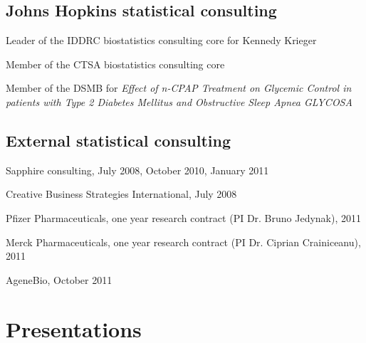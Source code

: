 \documentclass[12pt]{article}
\begin{document}
\subsection*{Johns Hopkins statistical consulting}
\begin{description}
\item Leader of the IDDRC biostatistics consulting core for Kennedy Krieger 
\item Member of the CTSA biostatistics consulting core  
\item Member of the DSMB for {\it Effect of n-CPAP Treatment on Glycemic Control  in patients with  Type 2 
Diabetes Mellitus and Obstructive Sleep Apnea GLYCOSA}
\end{description}

\subsection*{External statistical consulting}
\begin{description}
\item Sapphire consulting, July 2008, October 2010, January 2011 
\item Creative Business Strategies International, July 2008
\item Pfizer Pharmaceuticals, one year research contract (PI Dr. Bruno Jedynak), 2011
\item Merck Pharmaceuticals, one year research contract (PI Dr. Ciprian Crainiceanu), 2011
\item AgeneBio, October 2011
\end{description}
\section*{Presentations}
\end{document}
